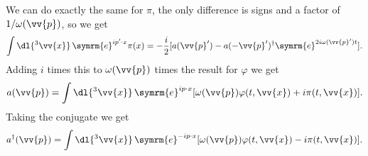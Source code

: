 \documentclass[fleqn]{NotesClass}
\newcommand{\e}{\symrm{e}}
\newcommand{\hermit}{{\dagger}}
\begin{document}
    We can do exactly the same for \(\pi\), the only difference is signs and a factor of \(1/\omega(\vv{p})\), so we get
    \begin{equation}
        \int \dl{^3\vv{x}} \, \e^{ip'\cdot x}  \pi(x) = -\frac{i}{2}[a(\vv{p}') - a(-\vv{p}')^\hermit \e^{2i\omega(\vv{p}')t}].
    \end{equation}
    Adding \(i\) times this to \(\omega(\vv{p})\) times the result for \(\varphi\) we get
    \begin{equation}
        a(\vv{p}) = \int \dl{^3\vv{x}} \, \e^{ip \cdot x} [\omega(\vv{p}) \varphi(t, \vv{x}) + i\pi(t, \vv{x})].
    \end{equation}
    Taking the conjugate we get
    \begin{equation}
        a^\hermit(\vv{p}) = \int \dl{^3\vv{x}} \, \e^{-ip \cdot x} [\omega(\vv{p}) \varphi(t, \vv{x}) - i\pi(t, \vv{x})].
    \end{equation}
    
\end{document}
